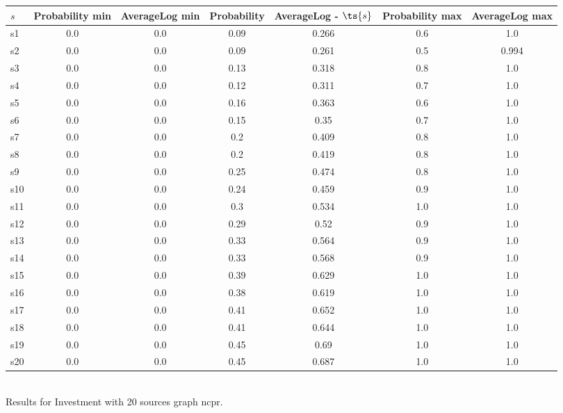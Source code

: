 \documentclass{article}
\begin{document}
\noindent\begin{tabular}{|l|c|c|c|c|c|c|}
\hline
$s$& Probability min & AverageLog min & Probability & AverageLog - $\ts{s}$ & Probability max & AverageLog max\\
\hline
s1 &0.0 & 0.0 & 0.09 & 0.266 & 0.6 & 1.0\\
\hline
s2 &0.0 & 0.0 & 0.09 & 0.261 & 0.5 & 0.994\\
\hline
s3 &0.0 & 0.0 & 0.13 & 0.318 & 0.8 & 1.0\\
\hline
s4 &0.0 & 0.0 & 0.12 & 0.311 & 0.7 & 1.0\\
\hline
s5 &0.0 & 0.0 & 0.16 & 0.363 & 0.6 & 1.0\\
\hline
s6 &0.0 & 0.0 & 0.15 & 0.35 & 0.7 & 1.0\\
\hline
s7 &0.0 & 0.0 & 0.2 & 0.409 & 0.8 & 1.0\\
\hline
s8 &0.0 & 0.0 & 0.2 & 0.419 & 0.8 & 1.0\\
\hline
s9 &0.0 & 0.0 & 0.25 & 0.474 & 0.8 & 1.0\\
\hline
s10 &0.0 & 0.0 & 0.24 & 0.459 & 0.9 & 1.0\\
\hline
s11 &0.0 & 0.0 & 0.3 & 0.534 & 1.0 & 1.0\\
\hline
s12 &0.0 & 0.0 & 0.29 & 0.52 & 0.9 & 1.0\\
\hline
s13 &0.0 & 0.0 & 0.33 & 0.564 & 0.9 & 1.0\\
\hline
s14 &0.0 & 0.0 & 0.33 & 0.568 & 0.9 & 1.0\\
\hline
s15 &0.0 & 0.0 & 0.39 & 0.629 & 1.0 & 1.0\\
\hline
s16 &0.0 & 0.0 & 0.38 & 0.619 & 1.0 & 1.0\\
\hline
s17 &0.0 & 0.0 & 0.41 & 0.652 & 1.0 & 1.0\\
\hline
s18 &0.0 & 0.0 & 0.41 & 0.644 & 1.0 & 1.0\\
\hline
s19 &0.0 & 0.0 & 0.45 & 0.69 & 1.0 & 1.0\\
\hline
s20 &0.0 & 0.0 & 0.45 & 0.687 & 1.0 & 1.0\\
\hline
\end{tabular}\\

\noindent Results for Investment with 20 sources graph ncpr.
\end{document}
